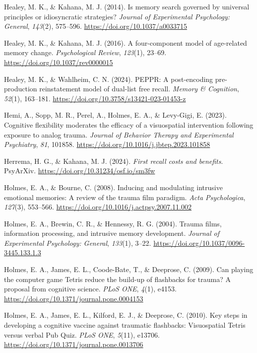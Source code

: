 \documentclass[
  man,
  floatsintext,
  longtable,
  nolmodern,
  notxfonts,
  notimes,
  draftfirst,
  colorlinks=true,linkcolor=blue,citecolor=blue,urlcolor=blue]{apa7}
\newlength{\cslhangindent}
\newenvironment{CSLReferences}[2] %
 {\begin{list}{}{%
  \setlength{\itemindent}{0pt}
  \setlength{\leftmargin}{0pt}
  \setlength{\parsep}{0pt}
  \ifodd #1
   \setlength{\leftmargin}{\cslhangindent}
   \setlength{\itemindent}{-1\cslhangindent}
  \fi
  \setlength{\itemsep}{#2\baselineskip}}}
 {\end{list}}
\begin{document}
\begin{CSLReferences}{1}{0}
Healey, M. K., \& Kahana, M. J. (2014). Is memory search governed by
universal principles or idiosyncratic strategies? \emph{Journal of
Experimental Psychology: General}, \emph{143}(2), 575--596.
\url{https://doi.org/10.1037/a0033715}

Healey, M. K., \& Kahana, M. J. (2016). A four-component model of
age-related memory change. \emph{Psychological Review}, \emph{123}(1),
23--69. \url{https://doi.org/10.1037/rev0000015}

Healey, M. K., \& Wahlheim, C. N. (2024). {PEPPR}: A post-encoding
pre-production reinstatement model of dual-list free recall.
\emph{Memory \& Cognition}, \emph{52}(1), 163--181.
\url{https://doi.org/10.3758/s13421-023-01453-z}

Hemi, A., Sopp, M. R., Perel, A., Holmes, E. A., \& Levy-Gigi, E.
(2023). Cognitive flexibility moderates the efficacy of a visuospatial
intervention following exposure to analog trauma. \emph{Journal of
Behavior Therapy and Experimental Psychiatry}, \emph{81}, 101858.
\url{https://doi.org/10.1016/j.jbtep.2023.101858}

Herrema, H. G., \& Kahana, M. J. (2024). \emph{First recall costs and
benefits}. PsyArXiv. \url{https://doi.org/10.31234/osf.io/sm3fw}

Holmes, E. A., \& Bourne, C. (2008). Inducing and modulating intrusive
emotional memories: A review of the trauma film paradigm. \emph{Acta
Psychologica}, \emph{127}(3), 553--566.
\url{https://doi.org/10.1016/j.actpsy.2007.11.002}

Holmes, E. A., Brewin, C. R., \& Hennessy, R. G. (2004). Trauma films,
information processing, and intrusive memory development. \emph{Journal
of Experimental Psychology: General}, \emph{133}(1), 3--22.
\url{https://doi.org/10.1037/0096-3445.133.1.3}

Holmes, E. A., James, E. L., Coode-Bate, T., \& Deeprose, C. (2009). Can
playing the computer game {Tetris} reduce the build-up of flashbacks for
trauma? A proposal from cognitive science. \emph{PLoS ONE}, \emph{4}(1),
e4153. \url{https://doi.org/10.1371/journal.pone.0004153}

Holmes, E. A., James, E. L., Kilford, E. J., \& Deeprose, C. (2010). Key
steps in developing a cognitive vaccine against traumatic flashbacks:
Visuospatial {Tetris} versus verbal {Pub Quiz}. \emph{PLoS ONE},
\emph{5}(11), e13706. \url{https://doi.org/10.1371/journal.pone.0013706}


\end{CSLReferences}
\end{document}

